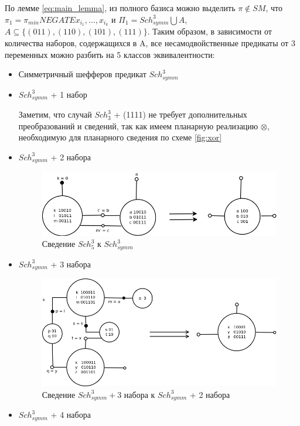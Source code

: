 \documentclass[12pt]{article}
\begin{document}
По лемме \ref{eq:main_lemma}, из полного базиса можно выделить $\pi \notin SM$, что 
$\pi_1 = \pi_{min} NEGATE x_{i_1}, \dots, x_{i_k}$ и $\Pi_1 = Sch_{symm}^3 \bigcup A$,
$A \subseteq \{ (011), (110), (101), (111) \} $.
Таким образом, в зависимости от количества наборов, содержащихся в A, все несамодвойственные
предикаты от 3 переменных можно разбить на 5 классов эквивалентности:
\begin{itemize}
\item{Симметричный шефферов предикат $Sch_{symm}^3$}
\item{$Sch_{symm}^3$ + 1 набор}

Заметим, что случай $Sch_3^3$ + (1111) не требует дополнительных преобразований и сведений, так как имеем планарную реализацию
$\otimes$, необходимую для планарного сведения по схеме \ref{fig:xor}
\item{$Sch_{symm}^3$ + 2 набора}
\begin{figure}[htb]
\centering
\includegraphics[width=1.0\textwidth]{3_2to3.png}
\caption{Сведение $Sch_5^3$ к $Sch_{symm}^3$ }
\label{fig:3_2to3}
\end{figure}
\item{$Sch_{symm}^3$ + 3 набора}
\begin{figure}[htb]
\centering
\includegraphics[width=1.0\textwidth]{3_3to3_2.png}
\caption{Сведение $Sch_{symm}^3 + 3$ набора к $Sch_{symm}^3$ + 2 набора}
\label{fig:3_3to3_2}
\end{figure}
\item{$Sch_{symm}^3$ + 4 набора}
\begin{figure}[htb]

\end{figure}
\end{itemize}
\end{document}

